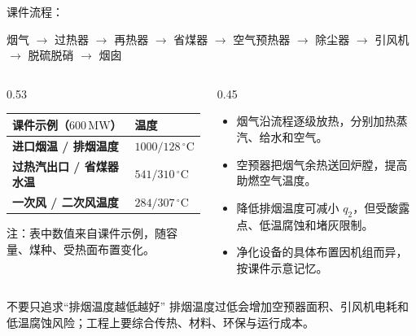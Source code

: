 \begin{frame}[t,shrink]{}
课件流程：
\begin{center}
\small 烟气 $\rightarrow$ 过热器 $\rightarrow$ 再热器 $\rightarrow$ 省煤器 $\rightarrow$ 空气预热器 $\rightarrow$ 除尘器 $\rightarrow$ 引风机 $\rightarrow$ 脱硫脱硝 $\rightarrow$ 烟囱
\end{center}
\begin{columns}[T,onlytextwidth]
\begin{column}{0.53\textwidth}
  \begin{smalltab}
  \begin{tabularx}{\linewidth}{@{}>{\bfseries}p{42mm}X@{}}
    \toprule
    课件示例（\(600\,\mathrm{MW}\)） & 温度\\
    \midrule
    进口烟温 / 排烟温度 & \(1000/128\,\mathrm{^\circ C}\)\\
    过热汽出口 / 省煤器水温 & \(541/310\,\mathrm{^\circ C}\)\\
    一次风 / 二次风温度 & \(284/307\,\mathrm{^\circ C}\)\\
    \bottomrule
  \end{tabularx}
  \end{smalltab}
  \vspace{0.5mm}
  {\fontsize{6.6}{8}\selectfont\textcolor{black!55}{注：表中数值来自课件示例，随容量、煤种、受热面布置变化。}}
\end{column}
\begin{column}{0.45\textwidth}
  \begin{itemize}
    \item 烟气沿流程逐级放热，分别加热蒸汽、给水和空气。
    \item 空预器把烟气余热送回炉膛，提高助燃空气温度。
    \item 降低排烟温度可减小 \(q_2\)，但受酸露点、低温腐蚀和堵灰限制。
    \item 净化设备的具体布置因机组而异，按课件示意记忆。
  \end{itemize}
\end{column}
\end{columns}
\vspace{0.5mm}
\begin{amberbox}{不要只追求“排烟温度越低越好”}
\small 排烟温度过低会增加空预器面积、引风机电耗和低温腐蚀风险；工程上要综合传热、材料、环保与运行成本。
\end{amberbox}
\end{frame}

